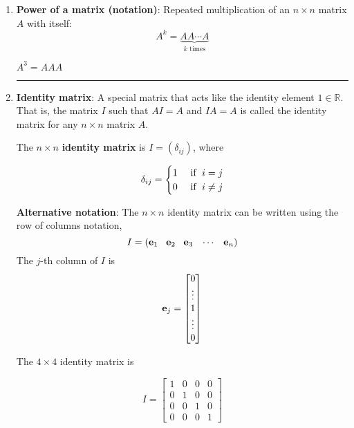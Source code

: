 \begin{enumerate}
\item \textbf{Power of a matrix (notation)}:  Repeated multiplication of an $n \times n$ matrix $A$ with itself:
\[  A^k = \underbrace{AA \cdots A}_{\text{$k$ times}} \]


\begin{example} $A^3 = AAA$
\end{example}


\rule[0.01in]{\textwidth}{0.0025in}



\item \textbf{Identity matrix}:  A special matrix that acts like the identity element $1 \in \mathbb{R}$.  That is, the matrix $I$ such that $AI = A$ and $IA=A$ is called the identity matrix for any $n \times n$ matrix $A$.

\begin{definition}
The $n \times n$ \textbf{identity matrix} is $I = (\delta_{ij})$,  where

\[ 
 \delta_{ij} =  \begin{cases} 	1 & \text{ if \;} i = j\\
						0 & \text{ if \;} i \ne j
			\end{cases}
			\]
\end{definition}



\textbf{Alternative notation}:  The $n \times n$ identity matrix can be written using the row of columns notation, 
$$ I  = ({\bf e}_1 \;\; \;{\bf e}_2 \; \;\; {\bf e}_3 \; \;\; \cdots \; \;\; {\bf e}_n)$$
The $j$-th column of $I$ is $${\bf e}_j = \begin{bmatrix} 0 \\ \vdots \\ 1 \\ \vdots \\   0 \end{bmatrix}$$

\begin{example}
The $4 \times 4$ identity matrix is

\[ I  = \begin{bmatrix} 1 & 0 &  0 &   0  \\ 0 & 1 &  0 &   0  \\ 0 & 0 &  1 &   0  \\ 0 & 0 &  0 &  1  \end{bmatrix} \]
 \end{example}
 
 \end{enumerate}


